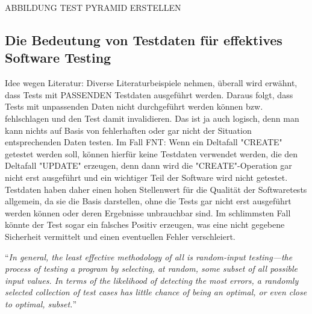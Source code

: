 ABBILDUNG TEST PYRAMID ERSTELLEN

\subsection{Die Bedeutung von Testdaten für effektives Software Testing}\label{subsec:testdaten}
Idee wegen Literatur: Diverse Literaturbeispiele nehmen, überall wird erwähnt, dass Tests mit PASSENDEN Testdaten ausgeführt werden. Daraus folgt, dass Tests mit unpassenden Daten nicht durchgeführt werden können bzw. fehlschlagen und den Test damit invalidieren. Das ist ja auch logisch, denn man kann nichts auf Basis von fehlerhaften oder gar nicht der Situation entsprechenden Daten testen. Im Fall FNT: Wenn ein Deltafall "CREATE" getestet werden soll, können hierfür keine Testdaten verwendet werden, die den Deltafall "UPDATE" erzeugen, denn dann wird die "CREATE"-Operation gar nicht erst ausgeführt und ein wichtiger Teil der Software wird nicht getestet. Testdaten haben daher einen hohen Stellenwert für die Qualität der Softwaretests allgemein, da sie die Basis darstellen, ohne die Tests gar nicht erst ausgeführt werden können oder deren Ergebnisse unbrauchbar sind. Im schlimmsten Fall könnte der Test sogar ein falsches Positiv erzeugen, was eine nicht gegebene Sicherheit vermittelt und einen eventuellen Fehler verschleiert.

\enquote{\textit{In general, the least effective methodology of all is random-input
testing—the process of testing a program by selecting, at random, some
subset of all possible input values. In terms of the likelihood of detecting
the most errors, a randomly selected collection of test cases has little
chance of being an optimal, or even close to optimal, subset.}} \cite[S. 41]{myers:2011}